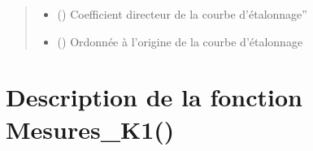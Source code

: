 \documentclass[letterpaper,10pt,french]{sphinxmanual}
\begin{document}
\begin{fulllineitems}
\begin{quote}
\begin{description}
\begin{itemize}
\end{itemize}

\sphinxAtStartPar
\begin{itemize}
\item {} 
\sphinxAtStartPar
{} () \textendash{} Coefficient directeur de la courbe d’étalonnage”

\item {} 
\sphinxAtStartPar
{} () \textendash{} Ordonnée à l’origine de la courbe d’étalonnage

\end{itemize}


\end{description}\end{quote}

\end{fulllineitems}



\section{Description de la fonction Mesures\_K1()}
\label{\detokenize{Documentation:description-de-la-fonction-mesures-k1}}
\end{document}
